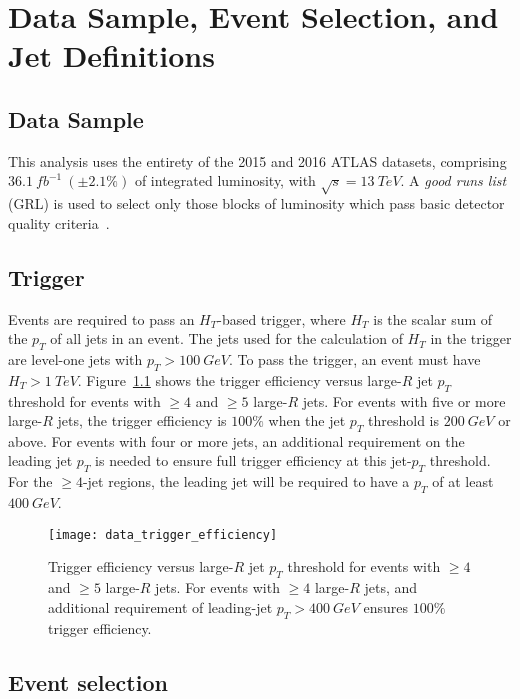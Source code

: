 \chapter{Data Sample, Event Selection, and Jet Definitions}\label{ch:data_and_event_selection}

\section{Data Sample}\label{sec:data}
This analysis uses the entirety of the 2015 and 2016 ATLAS datasets, comprising \linebreak $36.1~fb^{-1}~(\pm2.1\%)$ of integrated luminosity, with $\sqrt{s}=13~TeV$.
A \textit{good runs list} (GRL) is used to select only those blocks of luminosity which pass basic detector quality criteria~\cite{data-grl}.

\section{Trigger}\label{sec:trigger}
Events are required to pass an $H_{T}$-based trigger, where $H_{T}$ is the scalar sum of the $p_{T}$ of all jets in an event.
The jets used for the calculation of $H_{T}$ in the trigger are level-one jets with $p_{T}>100~GeV$.
To pass the trigger, an event must have $H_{T}>1~TeV$.
Figure~\ref{fig:trigger_efficiency} shows the trigger efficiency versus large-$R$ jet $p_{T}$ threshold for events with $\geq4$ and $\geq5$ large-$R$ jets.
For events with five or more large-$R$ jets, the trigger efficiency is $100\%$ when the jet $p_{T}$ threshold is $200~GeV$ or above.
For events with four or more jets, an additional requirement on the leading jet $p_{T}$ is needed to ensure full trigger efficiency at this jet-$p_{T}$ threshold.
For the $\geq4$-jet regions, the leading jet will be required to have a $p_{T}$ of at least $400~GeV$.

\begin{figure}[!ht]
    \centering
    \texttt{[image: data\_trigger\_efficiency]}
    \caption{Trigger efficiency versus large-$R$ jet $p_{T}$ threshold for events with $\geq4$ and $\geq5$ large-$R$ jets.
    For events with $\geq4$ large-$R$ jets, and additional requirement of leading-jet $p_{T}>400~GeV$ ensures $100\%$ trigger efficiency.
    }
    \label{fig:trigger_efficiency}
\end{figure}

\section{Event selection}\label{sec:event_selection}

